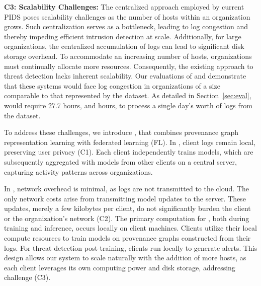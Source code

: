 \smallskip
\noindent
\textbf{C3: Scalability Challenges:} The centralized approach employed by current PIDS poses scalability challenges as the number of hosts within an organization grows. Such centralization serves as a bottleneck, leading to log congestion and thereby impeding efficient intrusion detection at scale. Additionally, for large organizations, the centralized accumulation of logs can lead to significant disk storage overhead. To accommodate an increasing number of hosts, organizations must continually allocate more resources. Consequently, the existing approach to threat detection lacks inherent scalability. Our evaluations of \flash and \kairos demonstrate that these systems would face log congestion in organizations of a size comparable to that represented by the \optc dataset. As detailed in Section~\ref{sec:eval}, \flash would require 27.7 hours, and  hours, to process a single day's worth of logs from the \optc dataset.
    



To address these challenges, we introduce \Sys, that combines provenance graph representation learning with federated learning (FL). In \Sys, client logs remain local, preserving user privacy (C1). Each client independently trains \gnnshort models, which are subsequently aggregated with models from other clients on a central server, capturing activity patterns across organizations.

In \Sys, network overhead is minimal, as logs are not transmitted to the cloud. The only network costs arise from transmitting model updates to the server. These updates, merely a few kilobytes per client, do not significantly burden the client or the organization's network (C2). The primary computation for \Sys, both during training and inference, occurs locally on client machines. Clients utilize their local compute resources to train models on provenance graphs constructed from their logs. For threat detection post-training, clients run \Sys locally to generate alerts. This design allows our system to scale naturally with the addition of more hosts, as each client leverages its own computing power and disk storage, addressing challenge (C3).

